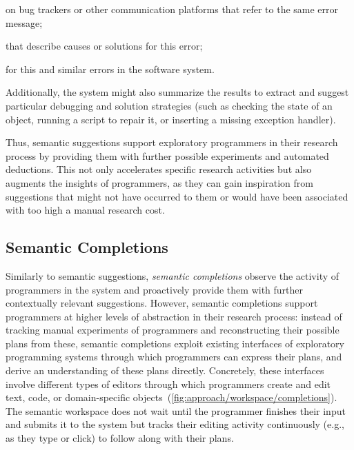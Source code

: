 	\begin{description}[noextralabelsep]
		\item[bug reports] on bug trackers or other communication platforms that refer to the same error message;
		\item[documentation artifacts] that describe causes or solutions for this error;
		\item[exception handlers] for this and similar errors in the software system.
	\end{description}

	\noindent
	Additionally, the system might also summarize the results to extract and suggest particular debugging and solution strategies (such as checking the state of an object, running a script to repair it, or inserting a missing exception handler).

\ParSep

Thus, semantic suggestions support exploratory programmers in their research process by providing them with further possible experiments and automated deductions.
This not only accelerates specific research activities but also augments the insights of programmers, as they can gain inspiration from suggestions that might not have occurred to them or would have been associated with too high a manual research cost.

\subsection{Semantic Completions}
\label{sec:approach/workspace/completions}

Similarly to semantic suggestions, \emph{semantic completions} observe the activity of programmers in the system and proactively provide them with further contextually relevant suggestions.
However, semantic completions support programmers at higher levels of abstraction in their research process:
instead of tracking manual experiments of programmers and reconstructing their possible plans from these, semantic completions exploit existing interfaces of exploratory programming systems through which programmers can express their plans, and derive an understanding of these plans directly.
Concretely, these interfaces involve different types of editors through which programmers create and edit text, code, or domain-specific objects~(\cref{fig:approach/workspace/completions}).
The semantic workspace does not wait until the programmer finishes their input and submits it to the system but tracks their editing activity continuously (e.g., as they type or click) to follow along with their plans.

